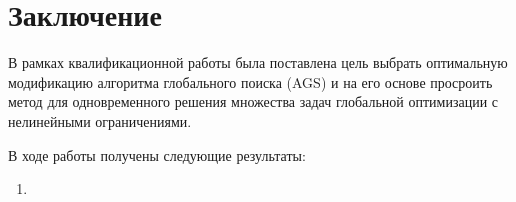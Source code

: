 \section*{Заключение}

В рамках квалификационной работы была поставлена цель выбрать оптимальную модификацию алгоритма глобального поиска (AGS)
и на его основе просроить метод для одновременного решения множества задач глобальной оптимизации с нелинейными ограничениями.

В ходе работы получены следующие результаты:
\begin{enumerate}
    \item 
\end{enumerate}
